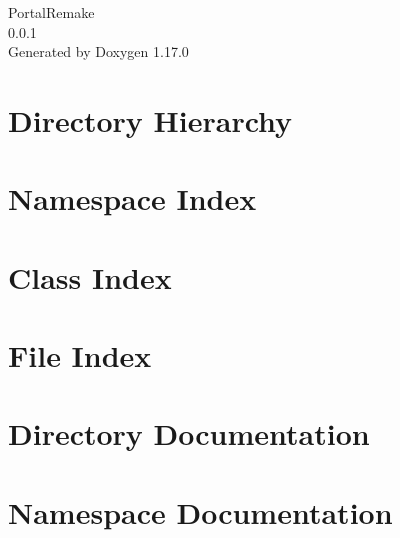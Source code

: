 \documentclass[twoside]{book}
\newcommand{\+}{\discretionary{\mbox{\scriptsize$\hookleftarrow$}}{}{}}
\newcommand{\clearemptydoublepage}{%
    \newpage{\pagestyle{empty}\cleardoublepage}%
  }
\begin{document}
  \raggedbottom
    \hypersetup{pageanchor=false,
                bookmarksnumbered=true,
                pdfencoding=unicode
               }
  \begin{titlepage}
  \vspace*{7cm}
  \begin{center}%
  {\Large Portal\+Remake}\\
  [1ex]\large 0.\+0.\+1 \\
  \vspace*{1cm}
  {\large Generated by Doxygen 1.17.0}\\
  \end{center}
  \end{titlepage}
  \clearemptydoublepage
  \tableofcontents
  \clearemptydoublepage
  \hypersetup{pageanchor=true}
\chapter{Directory Hierarchy}

\chapter{Namespace Index}

\chapter{Class Index}

\chapter{File Index}

\chapter{Directory Documentation}






\chapter{Namespace Documentation}


\end{document}

